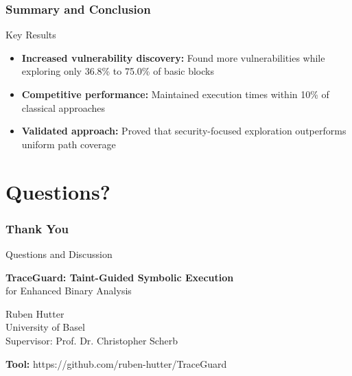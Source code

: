 \documentclass[aspectratio=169]{beamer}
\begin{document}
\begin{frame}
    \frametitle{Summary and Conclusion}
    \begin{implementation}{Key Results}
        \begin{itemize}
            \item \textbf{Increased vulnerability discovery:} Found more vulnerabilities while exploring only 36.8\% to 75.0\% of basic blocks
            \item \textbf{Competitive performance:} Maintained execution times within 10\% of classical approaches
            \item \textbf{Validated approach:} Proved that security-focused exploration outperforms uniform path coverage
        \end{itemize}
    \end{implementation}
\end{frame}

\section{Questions?}

\begin{frame}
    \frametitle{Thank You}
    \begin{center}
        \Large Questions and Discussion
        
        \vspace{2em}
        \normalsize
        \textbf{TraceGuard: Taint-Guided Symbolic Execution} \\
        for Enhanced Binary Analysis
        
        \vspace{1em}
        Ruben Hutter \\
        University of Basel \\
        Supervisor: Prof. Dr. Christopher Scherb
        
        \vspace{2em}
        \textbf{Tool:} https://github.com/ruben-hutter/TraceGuard
    \end{center}
\end{frame}
\end{document}
